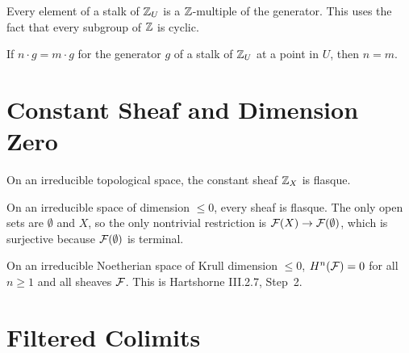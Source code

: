\begin{lemma}\label{lem:stalk_zsmul_generator}
  \leanok
  Every element of a stalk of $\mathbb{Z}_U$ is a $\mathbb{Z}$-multiple of the generator.
  This uses the fact that every subgroup of $\mathbb{Z}$ is cyclic.
\end{lemma}

\begin{lemma}\label{lem:zsmul_generator_injective}
  \leanok
  If $n \cdot g = m \cdot g$ for the generator $g$ of a stalk of $\mathbb{Z}_U$
  at a point in $U$, then $n = m$.
\end{lemma}


\chapter{Constant Sheaf and Dimension Zero}\label{ch:dimzero}

\begin{theorem}\label{thm:constantSheaf_flasque}
  \leanok
  On an irreducible topological space, the constant sheaf $\mathbb{Z}_X$ is flasque.
\end{theorem}

\begin{lemma}\label{lem:sheaf_restriction_epi_dim_zero}
  \leanok
  On an irreducible space of dimension $\le 0$, every sheaf is flasque.
  The only open sets are $\emptyset$ and $X$, so the only nontrivial
  restriction is $\mathcal{F}(X) \to \mathcal{F}(\emptyset)$, which is surjective
  because $\mathcal{F}(\emptyset)$ is terminal.
\end{lemma}

\begin{theorem}\label{thm:grothendieck_vanishing_dim_zero}
  \leanok
  On an irreducible Noetherian space of Krull dimension $\le 0$,
  $H^n(\mathcal{F}) = 0$ for all $n \ge 1$ and all sheaves $\mathcal{F}$.
  This is Hartshorne III.2.7, Step~2.
\end{theorem}


\chapter{Filtered Colimits}\label{ch:colimits}


